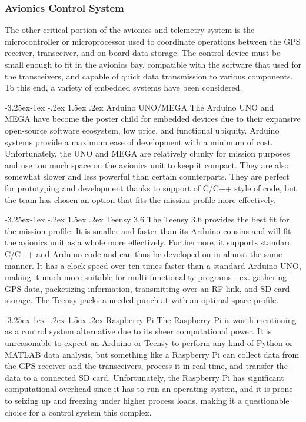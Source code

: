 \documentclass[onecolumn, draftclsnofoot, 10pt, compsoc]{IEEEtran}
\makeatletter
\renewcommand\paragraph{\@startsection{paragraph}{4}{\z@}%
                                     {-3.25ex\@plus -1ex \@minus -.2ex}%
                                     {1.5ex \@plus .2ex}%
                                     {\normalfont\normalsize\bfseries}}
\makeatother
\begin{document}
\subsubsection{Avionics Control System}
The other critical portion of the avionics and telemetry system is the microcontroller or microprocessor used to coordinate operations between the GPS receiver, transceiver, and on-board data storage. The control device must be small enough to fit in the avionics bay, compatible with the software that used for the transceivers, and capable of quick data transmission to various components. To this end, a variety of embedded systems have been considered.

\paragraph{Arduino UNO/MEGA}
The Arduino UNO and MEGA have become the poster child for embedded devices due to their expansive open-source software ecosystem, low price, and functional ubiquity. Arduino systems provide a maximum ease of development with a minimum of cost. Unfortunately, the UNO and MEGA are relatively clunky for mission purposes and use too much space on the avionics unit to keep it compact. They are also somewhat slower and less powerful than certain counterparts. They are perfect for prototyping and development thanks to support of C/C++ style of code, but the team has chosen an option that fits the mission profile more effectively. 

\paragraph{Teensy 3.6}
The Teensy 3.6 provides the best fit for the mission profile. It is smaller and faster than its Arduino cousins and will fit the avionics unit as a whole more effectively. Furthermore, it supports standard C/C++ and Arduino code and can thus be developed on in almost the same manner. It has a clock speed over ten times faster than a standard Arduino UNO, making it much more suitable for multi-functionality programs - ex. gathering GPS data, packetizing information, transmitting over an RF link, and SD card storage. The Teensy packs a needed punch at with an optimal space profile.

\paragraph{Raspberry Pi}
The Raspberry Pi is worth mentioning as a control system alternative due to its sheer computational power. It is unreasonable to expect an Arduino or Teensy to perform any kind of Python or MATLAB data analysis, but something like a Raspberry Pi can collect data from the GPS receiver and the transceivers, process it in real time, and transfer the data to a connected SD card. Unfortunately, the Raspberry Pi has significant computational overhead since it has to run an operating system, and it is prone to seizing up and freezing under higher process loads, making it a questionable choice for a control system this complex.
\end{document}
